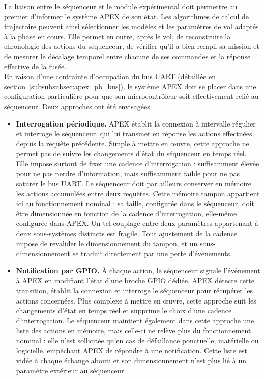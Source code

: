 La liaison entre le séquenceur et le module expérimental doit permettre au premier d'informer le système \gls{APEX} de son état. Les
algorithmes de calcul de trajectoire peuvent ainsi sélectionner les modèles et les paramètres de vol adaptés à la phase en cours. Elle
permet en outre, après le vol, de reconstruire la chronologie des actions du séquenceur, de vérifier qu'il a bien rempli sa mission et de
mesurer le décalage temporel entre chacune de ses commandes et la réponse effective de la fusée.\\

En raison d'une contrainte d'occupation du bus \acrshort{UART} (détaillée en section~\ref{subsubsubsec:apex_pb_bus}), le système
\gls{APEX} doit se placer dans une configuration particulière pour que son microcontrôleur soit effectivement relié au séquenceur. Deux
approches ont été envisagées.\\

\begin{itemize}
    \item \textbf{Interrogation périodique.} \gls{APEX} établit la connexion à intervalle régulier et interroge le séquenceur, qui lui
    transmet en réponse les actions effectuées depuis la requête précédente. Simple à mettre en œuvre, cette approche ne permet pas de
    suivre les changements d'état du séquenceur en temps réel. Elle impose surtout de fixer une cadence d'interrogation : suffisamment
    élevée pour ne pas perdre d'information, mais suffisamment faible pour ne pas saturer le bus \acrshort{UART}. Le séquenceur doit par
    ailleurs conserver en mémoire les actions accumulées entre deux requêtes. Cette mémoire tampon appartient ici au fonctionnement
    nominal : sa taille, configurée dans le séquenceur, doit être dimensionnée en fonction de la cadence d'interrogation, elle-même
    configurée dans \gls{APEX}. Un tel couplage entre deux paramètres appartenant à deux sous-systèmes distincts est fragile. Tout 
    ajustement de la cadence impose de revalider le dimensionnement du tampon, et un sous-dimensionnement se traduit directement par une
    perte d'événements.\\

    \item \textbf{Notification par \acrshort{GPIO}.} À chaque action, le séquenceur signale l'événement à \gls{APEX} en modifiant l'état
    d'une broche \acrshort{GPIO} dédiée. \gls{APEX} détecte cette transition, établit la connexion et interroge le séquenceur pour
    récupérer les actions concernées. Plus complexe à mettre en œuvre, cette approche suit les changements d'état en temps réel et
    supprime le choix d'une cadence d'interrogation. Le séquenceur maintient également dans cette approche une liste des actions en
    mémoire, mais celle-ci ne relève plus du fonctionnement nominal : elle n'est sollicitée qu'en cas de défaillance ponctuelle,
    matérielle ou logicielle, empêchant \gls{APEX} de répondre à une notification. Cette liste est vidée à chaque échange abouti et son
    dimensionnement n'est plus lié à un paramètre extérieur au séquenceur.
\end{itemize}

